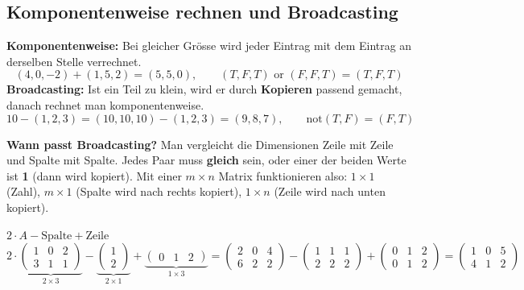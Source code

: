 \subsection*{Komponentenweise rechnen und Broadcasting}
\textbf{Komponentenweise:} Bei gleicher Grösse wird jeder Eintrag mit dem Eintrag an
derselben Stelle verrechnet.
\[
  (4, 0, -2) + (1, 5, 2) = (5, 5, 0), \qquad
  (T, F, T) \text{ or } (F, F, T) = (T, F, T)
\]
\textbf{Broadcasting:} Ist ein Teil zu klein, wird er durch \textbf{Kopieren} passend
gemacht, danach rechnet man komponentenweise.
\[
  10 - (1, 2, 3) = (10, 10, 10) - (1, 2, 3) = (9, 8, 7), \qquad
  \text{not}(T, F) = (F, T)
\]

\begin{merke}
  \textbf{Wann passt Broadcasting?} Man vergleicht die Dimensionen Zeile mit Zeile und
  Spalte mit Spalte. Jedes Paar muss \textbf{gleich} sein, oder einer der beiden Werte ist
  \textbf{1} (dann wird kopiert). Mit einer $m \times n$ Matrix funktionieren also:
  $1 \times 1$ (Zahl), \; $m \times 1$ (Spalte wird nach rechts kopiert), \;
  $1 \times n$ (Zeile wird nach unten kopiert).
\end{merke}

\begin{beispiel}{$2 \cdot A - \text{Spalte} + \text{Zeile}$}
  \[
    2 \cdot \underbrace{\begin{pmatrix}1&0&2\\3&1&1\end{pmatrix}}_{2\times3}
    - \underbrace{\begin{pmatrix}1\\2\end{pmatrix}}_{2\times1}
    + \underbrace{\begin{pmatrix}0&1&2\end{pmatrix}}_{1\times3}
    = \begin{pmatrix}2&0&4\\6&2&2\end{pmatrix}
    - \begin{pmatrix}1&1&1\\2&2&2\end{pmatrix}
    + \begin{pmatrix}0&1&2\\0&1&2\end{pmatrix}
    = \begin{pmatrix}1&0&5\\4&1&2\end{pmatrix}
  \]
\end{beispiel}

